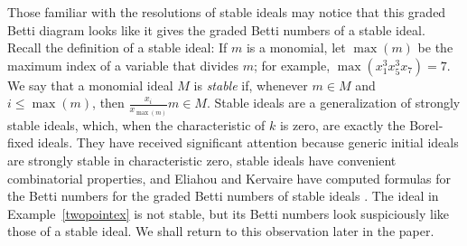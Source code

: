 \documentclass{article}
\begin{document}

Those familiar with the resolutions of stable ideals may notice that this graded Betti diagram looks like it gives the graded Betti numbers of a stable ideal. Recall the definition of a stable ideal: If $m$ is a monomial, let $\max(m)$ be the maximum index of a variable that divides $m$; for example, $\max(x_1^3x_5^3x_7)=7$. We say that a monomial ideal $M$ is \emph{stable} if, whenever $m \in M$ and $i\le \max(m)$, then $\frac{x_i}{x_{\max(m)}}m \in M$. Stable ideals are a generalization of strongly stable ideals, which, when the characteristic of $k$ is zero, are exactly the Borel-fixed ideals. They have received significant attention because generic initial ideals are strongly stable in characteristic zero, stable ideals have convenient combinatorial properties, and Eliahou and Kervaire have computed formulas for the Betti numbers for the graded Betti numbers of stable ideals \cite{EK}. The ideal in Example~\ref{twopointex} is not stable, but its Betti numbers look suspiciously like those of a stable ideal. We shall return to this observation later in the paper.
\end{document}
